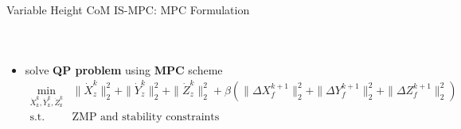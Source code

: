 \documentclass[10pt]{beamer}
\begin{document}
\begin{frame}{Variable Height CoM IS-MPC: MPC Formulation}
\begin{columns}[c,onlytextwidth]
\begin{figure}
				\label{fig:balance3d}
      \end{figure}
	\end{columns}
	\begin{itemize}
		\item solve \textbf{QP problem} using \textbf{MPC} scheme
			\begin{align*}
				\min_{\dot{X}_\text{z}^k, \dot{Y}_\text{z}^k, \dot{Z}_\text{z}^k}
						&\|\dot{X}_z^k\|_2^2 + \|\dot{Y}_z^k\|_2^2 + \|\dot{Z}_z^k\|_2^2 +
						\beta ( \|\Delta X_f^{k+1}\|_2^2 + \|\Delta Y_f^{k+1}\|_2^2 +
						\|\Delta Z_f^{k+1}\|_2^2 ) \\
						\textrm{s.t. } &\textrm{ZMP and stability constraints}
			\end{align*}
	\end{itemize}
\end{frame}
\end{document}

